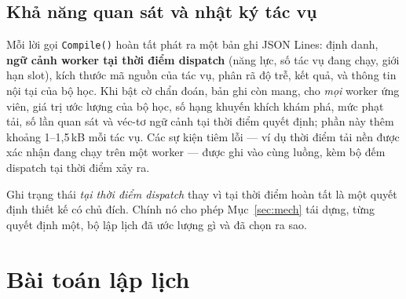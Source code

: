 \documentclass[final,5p,times,twocolumn]{elsarticle}
\begin{document}
\subsection{Khả năng quan sát và nhật ký tác vụ}
\label{sec:log}

Mỗi lời gọi \texttt{Compile()} hoàn tất phát ra một bản ghi JSON Lines: định danh, \textbf{ngữ cảnh worker tại thời điểm dispatch} (năng lực, số tác vụ đang chạy, giới hạn slot), kích thước mã nguồn của tác vụ, phân rã độ trễ, kết quả, và thông tin nội tại của bộ học. Khi bật cờ chẩn đoán, bản ghi còn mang, cho \emph{mọi} worker ứng viên, giá trị ước lượng của bộ học, số hạng khuyến khích khám phá, mức phạt tải, số lần quan sát và véc-tơ ngữ cảnh tại thời điểm quyết định; phần này thêm khoảng 1--1,5\,kB mỗi tác vụ. Các sự kiện tiêm lỗi --- ví dụ thời điểm tải nền được xác nhận đang chạy trên một worker --- được ghi vào cùng luồng, kèm bộ đếm dispatch tại thời điểm xảy ra.

Ghi trạng thái \emph{tại thời điểm dispatch} thay vì tại thời điểm hoàn tất là một quyết định thiết kế có chủ đích. Chính nó cho phép Mục~\ref{sec:mech} tái dựng, từng quyết định một, bộ lập lịch đã ước lượng gì và đã chọn ra sao.

\section{Bài toán lập lịch}
\label{sec:problem}
\end{document}
